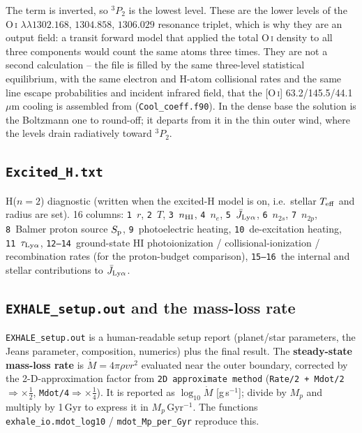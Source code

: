 \documentclass[english,a4paper]{my_memo}
\begin{document}
The term is inverted, so $^3P_2$ is the lowest level. These are the lower
levels of the O\,\textsc{i} $\lambda\lambda1302.168,\,1304.858,\,1306.029$
resonance triplet, which is why they are an output field: a transit forward
model that applied the total O\,\textsc{i} density to all three components
would count the same atoms three times. They are not a second calculation --
the file is filled by the same three-level statistical equilibrium, with the
same electron and H-atom collisional rates and the same line escape
probabilities and incident infrared field, that the [O\,\textsc{i}]
63.2/145.5/44.1\,$\mu$m cooling is assembled from
(\texttt{Cool\_coeff.f90}). In the dense base the solution is the Boltzmann
one to round-off; it departs from it in the thin outer wind, where the levels
drain radiatively toward $^3P_2$.

\subsection{\texttt{Excited\_H.txt}}
H($n{=}2$) diagnostic (written when the excited-H model is on, i.e.\ stellar
$T_{\rm eff}$ and radius are set). 16 columns:
\texttt{1}~$r$, \texttt{2}~$T$, \texttt{3}~$n_{\rm HI}$, \texttt{4}~$n_e$,
\texttt{5}~$\bar J_{\rm Ly\alpha}$, \texttt{6}~$n_{2s}$, \texttt{7}~$n_{2p}$,
\texttt{8}~Balmer proton source $S_{\rm p}$, \texttt{9}~photoelectric heating,
\texttt{10}~de-excitation heating, \texttt{11}~$\tau_{\rm Ly\alpha}$,
\texttt{12--14}~ground-state HI photoionization / collisional-ionization /
recombination rates (for the proton-budget comparison), \texttt{15--16}~the
internal and stellar contributions to $\bar J_{\rm Ly\alpha}$.

\subsection{\texttt{EXHALE\_setup.out} and the mass-loss rate}
\texttt{EXHALE\_setup.out} is a human-readable setup report (planet/star parameters, the
Jeans parameter, composition, numerics) plus the final result. The
\textbf{steady-state mass-loss rate} is $\dot M = 4\pi\rho v r^2$ evaluated near
the outer boundary, corrected by the 2-D-approximation factor from
\texttt{2D approximate method} (\texttt{Rate/2 + Mdot/2}$\Rightarrow\times\frac12$,
\texttt{Mdot/4}$\Rightarrow\times\frac14$). It is reported as $\log_{10}\dot M$
[g\,s$^{-1}$]; divide by $M_p$ and multiply by 1\,Gyr to express it in
$M_p$\,Gyr$^{-1}$. The functions \texttt{exhale\_io.mdot\_log10} / \texttt{mdot\_Mp\_per\_Gyr}
reproduce this.
\end{document}
